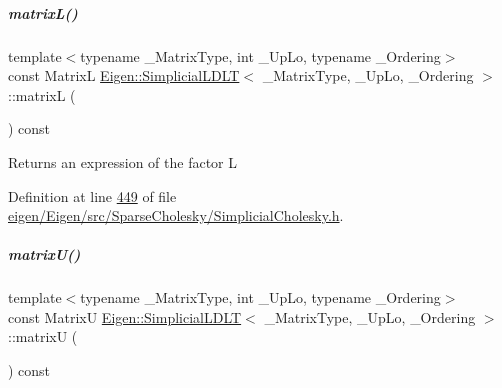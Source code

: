 \mbox{\label{group___sparse_cholesky___module_ae8f502eff0c95771115968510e4d9af5}} 
\subparagraph{\texorpdfstring{matrix\+L()}{matrixL()}\hspace{0.1cm}{\footnotesize\ttfamily [2/2]}}
{\footnotesize\ttfamily template$<$typename \+\_\+\+Matrix\+Type, int \+\_\+\+Up\+Lo, typename \+\_\+\+Ordering$>$ \\
const MatrixL \hyperlink{group___sparse_cholesky___module_class_eigen_1_1_simplicial_l_d_l_t}{Eigen\+::\+Simplicial\+L\+D\+LT}$<$ \+\_\+\+Matrix\+Type, \+\_\+\+Up\+Lo, \+\_\+\+Ordering $>$\+::matrixL (\begin{DoxyParamCaption}{ }\end{DoxyParamCaption}) const\hspace{0.3cm}{\ttfamily [inline]}}

\begin{DoxyReturn}{Returns}
an expression of the factor L 
\end{DoxyReturn}


Definition at line \hyperlink{eigen_2_eigen_2src_2_sparse_cholesky_2_simplicial_cholesky_8h_source_l00449}{449} of file \hyperlink{eigen_2_eigen_2src_2_sparse_cholesky_2_simplicial_cholesky_8h_source}{eigen/\+Eigen/src/\+Sparse\+Cholesky/\+Simplicial\+Cholesky.\+h}.

\mbox{\label{group___sparse_cholesky___module_ae98ed1c7ce8f9165adf5fb08cbb36b70}} 
\subparagraph{\texorpdfstring{matrix\+U()}{matrixU()}\hspace{0.1cm}{\footnotesize\ttfamily [1/2]}}
{\footnotesize\ttfamily template$<$typename \+\_\+\+Matrix\+Type, int \+\_\+\+Up\+Lo, typename \+\_\+\+Ordering$>$ \\
const MatrixU \hyperlink{group___sparse_cholesky___module_class_eigen_1_1_simplicial_l_d_l_t}{Eigen\+::\+Simplicial\+L\+D\+LT}$<$ \+\_\+\+Matrix\+Type, \+\_\+\+Up\+Lo, \+\_\+\+Ordering $>$\+::matrixU (\begin{DoxyParamCaption}{ }\end{DoxyParamCaption}) const\hspace{0.3cm}{\ttfamily [inline]}}

